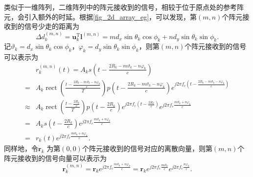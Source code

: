 类似于一维阵列，二维阵列中的阵元接收到的信号，相较于位于原点处的参考阵元，会引入额外的时延。根据\cref{fig_2d_array_eg}，可以发现，第\( (m,n) \)个阵元接收到的信号少走的距离为
\[
    \Delta d^{(m,n)}_k = \bm{u}_k^{\mathrm{T}} \bm{l}^{(m,n)} = m d_x \sin\theta_k \cos\phi_k + n d_y \sin\theta_k \sin\phi_k.
\]
记\( \vartheta_k = d_x \sin\theta_k \cos\phi_k \)，\( \varphi_k = d_y \sin\theta_k \sin\phi_k \)，则第\( (m,n) \)个阵元接收到的信号可以表示为
\[
    \begin{split}
                & r^{(m,n)}_k(t) = A_k s\left(t - \frac{2 R_k - m \vartheta_k - n \varphi_k}{c}\right)                                                                                                                                                           \\
        =       & A_k \operatorname{rect}\left(\frac{t - \frac{2 R_k - m \vartheta_k - n \varphi_k}{c}}{T}\right) p\left(t - \frac{2 R_k - m \vartheta_k - n \varphi_k}{c}\right) e^{j 2 \pi f_c \left(t - \frac{2 R_k - m \vartheta_k - n \varphi_k}{c}\right)} \\
        \approx & A_k \operatorname{rect}\left(\frac{t - \frac{2 R_k}{c}}{T}\right) p\left(t - \frac{2 R_k}{c}\right) e^{j 2 \pi f_c \left(t - \frac{2 R_k}{c}\right)} e^{j 2 \pi f_c \frac{m \vartheta_k + n \varphi_k}{c}}                                     \\
        =       & A_k s\left(t - \frac{2 R_k}{c}\right) e^{j 2 \pi f_c \frac{m \vartheta_k + n \varphi_k}{c}}                                                                                                                                                    \\
        =       & r_k(t) e^{j 2 \pi f_c \frac{m \vartheta_k + n \varphi_k}{c}}.
    \end{split}
\]
同样地，令\( \bm{r}_k \) 为第\( (0,0) \)个阵元接收到的信号对应的离散向量，则第\( (m,n) \)个阵元接收到的信号向量可以表示为
\[
    \bm{r}_k^{(m,n)} = \bm{r}_k e^{j 2 \pi f_c \frac{m \vartheta_k + n \varphi_k}{c}} = \bm{r}_k e^{j 2 \pi f_c \frac{m \vartheta_k}{c}} e^{j 2 \pi f_c \frac{n \varphi_k}{c}}.
\]

